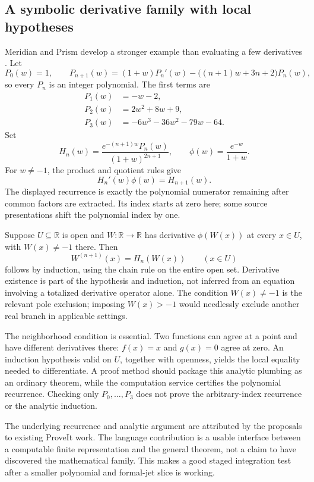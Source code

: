 \documentclass[11pt,letterpaper]{article}
\newcommand{\R}{\mathbb R}
\begin{document}
\subsection{A symbolic derivative family with local hypotheses}
Meridian and Prism develop a stronger example than evaluating a few derivatives
\cite[Lambert derivative developments]{meridian,prism}. Let
\[
 P_0(w)=1,\qquad
 P_{n+1}(w)=(1+w)P_n'(w)-\bigl((n+1)w+3n+2\bigr)P_n(w),
\]
so every \(P_n\) is an integer polynomial. The first terms are
\begin{align*}
 P_1(w)&=-w-2,\\
 P_2(w)&=2w^2+8w+9,\\
 P_3(w)&=-6w^3-36w^2-79w-64.
\end{align*}
Set
\[
 H_n(w)=\frac{e^{-(n+1)w}P_n(w)}{(1+w)^{2n+1}},\qquad
 \phi(w)=\frac{e^{-w}}{1+w}.
\]
For \(w\ne-1\), the product and quotient rules give
\[
 H_n'(w)\phi(w)=H_{n+1}(w).
\]
The displayed recurrence is exactly the polynomial numerator remaining after
common factors are extracted. Its index starts at zero here; some source
presentations shift the polynomial index by one.

Suppose \(U\subseteq\R\) is open and \(W:\R\to\R\) has derivative
\(\phi(W(x))\) at every \(x\in U\), with \(W(x)\ne-1\) there. Then
\[
 W^{(n+1)}(x)=H_n(W(x))\qquad(x\in U)
\]
follows by induction, using the chain rule on the entire open set. Derivative
existence is part of the hypothesis and induction, not inferred from an
equation involving a totalized derivative operator alone. The condition
\(W(x)\ne-1\) is the relevant pole exclusion; imposing \(W(x)>-1\) would
needlessly exclude another real branch in applicable settings.

The neighborhood condition is essential. Two functions can agree at a point
and have different derivatives there: \(f(x)=x\) and \(g(x)=0\) agree at zero.
An induction hypothesis valid on \(U\), together with openness, yields the
local equality needed to differentiate. A proof method should package this
analytic plumbing as an ordinary theorem, while the computation service
certifies the polynomial recurrence. Checking only \(P_0,\ldots,P_3\) does
not prove the arbitrary-index recurrence or the analytic induction.

The underlying recurrence and analytic argument are attributed by the proposals
to existing ProveIt work. The language contribution is a usable interface
between a computable finite representation and the general theorem, not a claim
to have discovered the mathematical family. This makes a good staged integration test
after a smaller polynomial and formal-jet slice is working.
\end{document}
